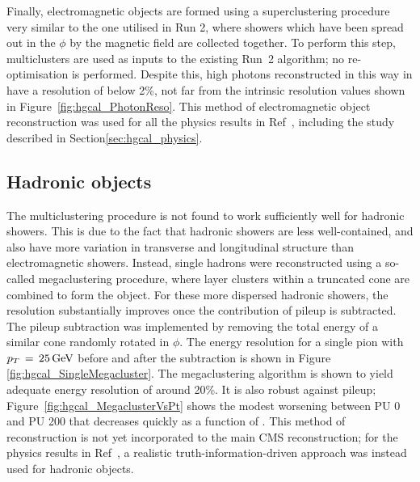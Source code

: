 Finally, electromagnetic objects are formed using a superclustering procedure very similar to the one utilised in Run 2, 
where showers which have been spread out in the $\phi$ by the magnetic field are collected together.
To perform this step, multiclusters are used as inputs to the existing Run~2 algorithm; no re-optimisation is performed.
Despite this, high \pt photons reconstructed in this way in have a resolution of below 2\%, 
not far from the intrinsic resolution values shown in Figure~\ref{fig:hgcal_PhotonReso}.
This method of electromagnetic object reconstruction was used for all the physics results in Ref~\cite{HGCAL}, 
including the study described in Section\ref{sec:hgcal_physics}.


\subsection{Hadronic objects}

The multiclustering procedure is not found to work sufficiently well for hadronic showers.
This is due to the fact that hadronic showers are less well-contained, and also have more variation in transverse and longitudinal structure than electromagnetic showers.
Instead, single hadrons were reconstructed using a so-called megaclustering procedure, where layer clusters within a truncated cone are combined to form the object. 
For these more dispersed hadronic showers, the resolution substantially improves once the contribution of pileup is subtracted.
The pileup subtraction was implemented by removing the total energy of a similar cone randomly rotated in $\phi$. 
The energy resolution for a single pion with $p_T\,=\,\SI{25}{GeV}$ before and after the subtraction is shown in Figure \ref{fig:hgcal_SingleMegacluster}. 
The megaclustering algorithm is shown to yield adequate energy resolution of around 20\%. 
It is also robust against pileup; Figure~\ref{fig:hgcal_MegaclusterVsPt} shows the modest worsening between PU 0 and PU 200 that decreases quickly as a function of \pt.
This method of reconstruction is not yet incorporated to the main CMS reconstruction; 
for the physics results in Ref~\cite{HGCAL}, a realistic truth-information-driven approach was instead used for hadronic objects.

